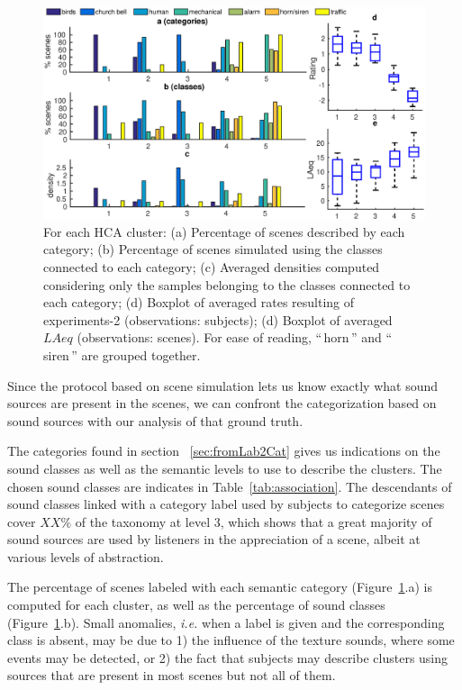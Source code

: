 \documentclass[twoside,twocolumn]{article}
\begin{document}
\begin{figure}[t!]
\centering
\includegraphics[width=.8\paperwidth]{../gfxMatlab/xp3_2.eps} 
\caption{\label{fig:xp3_2} For each HCA cluster: (a) Percentage of scenes described by each category; (b) Percentage of scenes simulated using the classes connected to each category; (c) Averaged densities computed considering only the samples belonging to the classes connected to each category; (d) Boxplot of averaged rates resulting of experiments-2 (observations: subjects); (d) Boxplot of averaged $LAeq$ (observations: scenes). For ease of reading, ``\,horn\,'' and ``\,siren\,'' are grouped together.}
\end{figure}

Since the protocol based on scene simulation lets us know exactly what sound sources are present in the scenes, we can confront the categorization based on sound sources with our analysis of that ground truth.

The categories found in section ~\ref{sec:fromLab2Cat} gives us indications on the sound classes as well as the semantic levels to use to describe the clusters. The chosen sound classes are indicates in Table~\ref{tab:association}.  The descendants of sound classes linked with a category label used by subjects to categorize scenes cover $XX\%$ of the taxonomy at level 3, which shows that a great majority of sound sources are used by listeners in the appreciation of a scene, albeit at various levels of abstraction.


The percentage of scenes labeled with each semantic category (Figure~\ref{fig:xp3_2}.a) is computed for each cluster, as well as the percentage of sound classes (Figure~\ref{fig:xp3_2}.b). Small anomalies, \textit{i.e.} when a label is given and the corresponding class is absent, may be due to 1) the influence of the texture sounds, where some events may be detected, or 2) the fact that subjects may describe clusters using sources that are present in most scenes but not all of them. 
 
\end{document}
